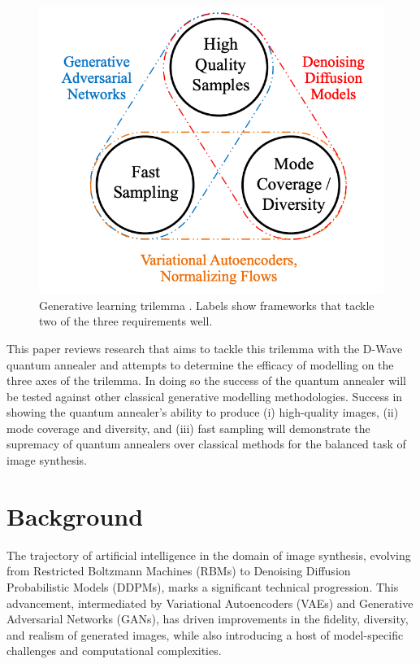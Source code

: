 \documentclass[%
 reprint,
 amsmath,amssymb,
 aps,
]{revtex4-2}
\begin{document}
\begin{figure}[h]
\includegraphics[width=0.9\columnwidth]{trilemma.png}%
\caption{\label{fig:trilemma} Generative learning trilemma \cite{xiao2022DDGAN}. Labels show frameworks that tackle two of the three requirements well.}
\end{figure}

This paper reviews research that aims to tackle this trilemma with the D-Wave quantum annealer and attempts to determine the efficacy of modelling on the three axes of the trilemma. In doing so the success of the quantum annealer will be tested against other classical generative modelling methodologies. Success in showing the quantum annealer's ability to produce (i) high-quality images, (ii) mode coverage and diversity, and (iii) fast sampling will demonstrate the supremacy of quantum annealers over classical methods for the balanced task of image synthesis.


\section{Background}
The trajectory of artificial intelligence in the domain of image synthesis, evolving from Restricted Boltzmann Machines (RBMs) to Denoising Diffusion Probabilistic Models (DDPMs), marks a significant technical progression. This advancement, intermediated by Variational Autoencoders (VAEs) and Generative Adversarial Networks (GANs), has driven improvements in the fidelity, diversity, and realism of generated images, while also introducing a host of model-specific challenges and computational complexities.
\end{document}
